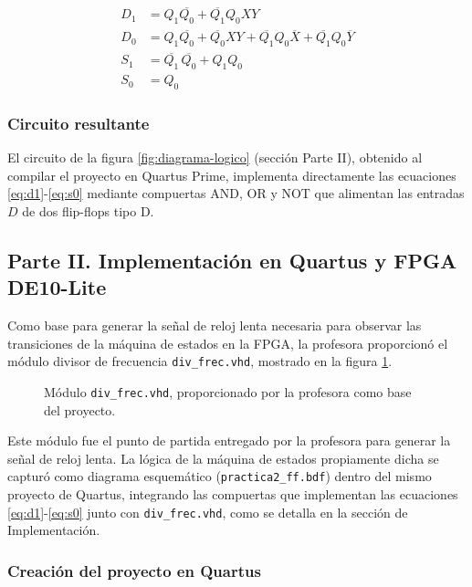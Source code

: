 \begin{align}
  D_1 &= Q_1\overline{Q_0} + \overline{Q_1}Q_0XY \label{eq:d1}\\
  D_0 &= Q_1\overline{Q_0} + \overline{Q_0}XY + \overline{Q_1}Q_0\overline{X}
        + \overline{Q_1}Q_0\overline{Y} \label{eq:d0}\\
  S_1 &= \overline{Q_1}\,\overline{Q_0} + Q_1Q_0 \label{eq:s1}\\
  S_0 &= Q_0 \label{eq:s0}
\end{align}

\subsubsection{Circuito resultante}

El circuito de la figura \ref{fig:diagrama-logico} (sección Parte II), obtenido al
compilar el proyecto en Quartus Prime, implementa directamente las ecuaciones
\ref{eq:d1}-\ref{eq:s0} mediante compuertas AND, OR y NOT que alimentan las entradas $D$
de dos flip-flops tipo D.

\subsection{Parte II. Implementación en Quartus y FPGA DE10-Lite}

Como base para generar la señal de reloj lenta necesaria para observar las transiciones
de la máquina de estados en la FPGA, la profesora proporcionó el módulo divisor de
frecuencia \texttt{div\_frec.vhd}, mostrado en la figura \ref{fig:div_frec}.

\begin{figure}[H]
  \centering
  
  \caption{Módulo \texttt{div\_frec.vhd}, proporcionado por la profesora como base del
    proyecto.}
  \label{fig:div_frec}
\end{figure}

Este módulo fue el punto de partida entregado por la profesora para generar la señal de
reloj lenta. La lógica de la máquina de estados propiamente dicha se capturó como
diagrama esquemático (\texttt{practica2\_ff.bdf}) dentro del mismo proyecto de Quartus,
integrando las compuertas que implementan las ecuaciones \ref{eq:d1}-\ref{eq:s0} junto
con \texttt{div\_frec.vhd}, como se detalla en la sección de Implementación.

\subsubsection{Creación del proyecto en Quartus}

